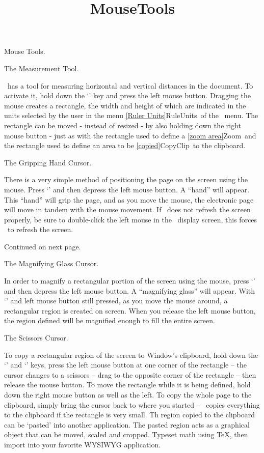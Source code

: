 \newpage

\title{MouseTools}Mouse Tools.

The Measurement Tool.

\ has a tool for measuring horizontal and vertical distances in
the document.  To activate it, hold down the `' key and press
the left mouse button.  Dragging the mouse creates a rectangle, the
width and height of which are indicated in the units selected by the
user in the menu \ref{Ruler Units}{RuleUnits}\ of the 
\ menu.
   \bigskip
The rectangle can be moved - instead of resized - by also holding down the
right mouse button - just as with the rectangle used to define a
\ref{zoom area}{Zoom}\ and the rectangle used to define an area to be
\ref{copied}{CopyClip}\ to the clipboard.
   \bigskip
   
The Gripping Hand Cursor.

There is a very simple method of positioning the page on the screen
using the mouse.  Press `' and then depress the left mouse
button. A ``hand'' will appear.  This ``hand'' will grip the page,
and as you move the mouse, the electronic page will move in tandem with
the mouse movement.  If \ does not refresh the screen properly,
be sure to double-click the left mouse in the \ display screen,
this forces \ to refresh the screen.
   
	\medskip

Continued on next page\ellipses.

\newpage

The Magnifying Glass Cursor.

In order to magnify a rectangular portion of the screen using the mouse,
press `' and then depress the left mouse button.  A ``magnifying
glass'' will appear.  With `' and left mouse button still
pressed, as you move the mouse around, a rectangular region is created
on screen.  When you release the left mouse button, the region defined
will be magnified enough to fill the entire screen.
   \bigskip
   
The Scissors Cursor.

To copy a rectangular region of the screen to Window's clipboard, hold
down the `' and `' keys, press the left mouse
button at one corner of the rectangle -- the cursor changes to a
scissors -- drag to the opposite corner of the rectangle -- then release
the mouse button.  To move the rectangle while it is being defined, hold
down the right mouse button as well as the left.  To copy the whole page
to the clipboard, simply bring the cursor back to where you started --
\ copies everything to the clipboard if the rectangle is very
small.
   \medskip
Th region copied to the clipboard can be `pasted' into another
application.  The pasted region acts as a graphical object that can be
moved, scaled and cropped.  Typeset math using \TeX, then import into
your favorite WYSIWYG application. 
   \bigskip


